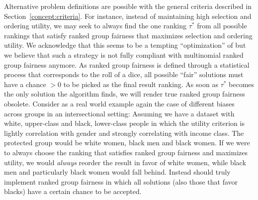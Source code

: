 \label{concept:related-problems}
%
Alternative problem definitions are possible with the general criteria described in Section~\ref{concept:criteria}.
%
For instance, instead of maintaining high selection and ordering utility, we may seek to always find the one ranking $\tau^*$ from all possible rankings that satisfy ranked group fairness that maximizes selection and ordering utility.
%
We acknowledge that this seems to be a tempting ``optimization'' of \algoFAIR but we believe that such a strategy is not fully compliant with multinomial ranked group fairness anymore.
%
As ranked group fairness is defined through a statistical process that corresponds to the roll of a dice, all possible ``fair'' solutions must have a chance $>0$ to be picked as the final result ranking.
%
As soon as $\tau^*$ becomes the only solution the algorithm finds, we will render true ranked group fairness obsolete.
%
Consider as a real world example again the case of different biases across groups in an intersectional setting:
%
Assuming we have a dataset with white, upper-class and black, lower-class people in which the utility criterion is lightly correlation with gender and strongly correlating with income class.
%
The protected group would be white women, black men and black women.
%
If we were to always choose the ranking that satisfies ranked group fairness and maximizes utility, we would \emph{always} reorder the result in favor of white women, while black men and particularly black women would fall behind.
%
Instead \algoFAIR should truly implement ranked group fairness in which all solutions (also those that favor blacks) have a certain chance to be accepted.
